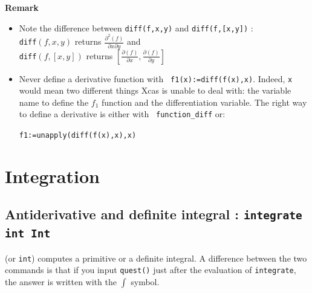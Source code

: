 \documentclass[a4paper,11pt]{book}
\begin{document}
{\bf Remark}
\begin{itemize}
\item 
Note the difference between {\tt diff(f,x,y)} and {\tt  diff(f,[x,y])} :\\
{\tt diff}$(f,x,y)$ returns $\displaystyle \frac{\partial^2(f)}{\partial x\partial y}$ and\\
{\tt diff}$(f,[x,y])$ returns
$\displaystyle[\frac{\partial(f)}{\partial x},\frac{\partial
  (f)}{\partial y}]$ 
\item Never define a derivative function with {\tt
    f1(x):=diff(f(x),x)}.
Indeed, {\tt x} would mean two different things Xcas is unable to
deal with: the variable name to
define the $f_1$ function and the differentiation variable.
The right way to define a derivative is either with {\tt
  function\_diff} or:
\begin{center}
{\tt f1:=unapply(diff(f(x),x),x)}
\end{center}
\end{itemize}

\section{Integration}
\subsection{Antiderivative and definite integral : {\tt integrate int Int}}
 (or {\tt int}) computes a primitive
or a definite integral. A difference between the two 
commands is that if you input {\tt quest()} just after the evaluation of 
{\tt  integrate}, the answer is written with the $\int$ symbol.
\end{document}
